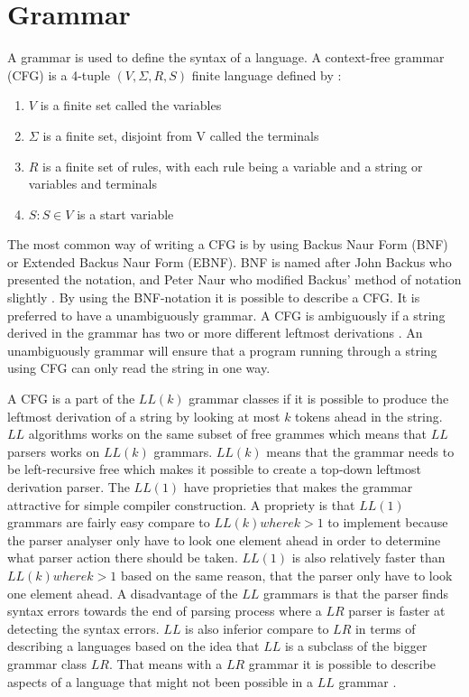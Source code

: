 \section{Grammar}
\label{sec:grammar}
A grammar is used to define the syntax of a language. A context-free grammar (CFG) is a 4-tuple $(V, \Sigma, R, S)$ finite language defined by \citep{sipser}:
\begin{enumerate}
\item $V$ is a finite set called the variables
\item $\Sigma$ is a finite set, disjoint from V called the terminals
\item $R$ is a finite set of rules, with each rule being a variable and a string or variables and terminals
\item $S: S \in V$ is a start variable
\end{enumerate}

The most common way of writing a CFG is by using Backus Naur Form (BNF) or Extended Backus Naur Form (EBNF). BNF is named after John Backus who presented the notation, and Peter Naur who modified Backus' method of notation slightly \citep{sebesta}. By using the BNF-notation it is possible to describe a CFG. It is preferred to have a unambiguously grammar. A CFG is ambiguously if a string derived in the grammar has two or more different leftmost derivations \citep{sipser}. An unambiguously grammar will ensure that a program running through a string using CFG can only read the string in one way.

A CFG is a part of the $LL(k)$ grammar classes if it is possible to produce the leftmost derivation of a string by looking at most $k$ tokens ahead in the string. $LL$ algorithms works on the same subset of free grammes which means that $LL$ parsers works on $LL(k)$ grammars. $LL(k)$ means that the grammar needs to be left-recursive free which makes it possible to create a top-down leftmost derivation parser.
The $LL(1)$ have proprieties that makes the grammar attractive for simple compiler construction. A propriety is that $LL(1)$ grammars are fairly easy compare to $LL(k) where k > 1$ to implement because the parser analyser only have to look one element ahead in order to determine what parser action there should be taken. $LL(1)$ is also relatively faster than $LL(k) where k > 1$ based on the same reason, that the parser only have to look one element ahead. A disadvantage of the $LL$ grammars is that the parser finds syntax errors towards the end of parsing process where a $LR$ parser is faster at detecting the syntax errors. $LL$ is also inferior compare to $LR$ in terms of describing a languages based on the idea that $LL$ is a subclass of the bigger grammar class $LR$. That means with a $LR$ grammar it is possible to describe aspects of a language that might not been possible in a $LL$ grammar \citep{CraftingACompiler} \citep{sebesta}.

